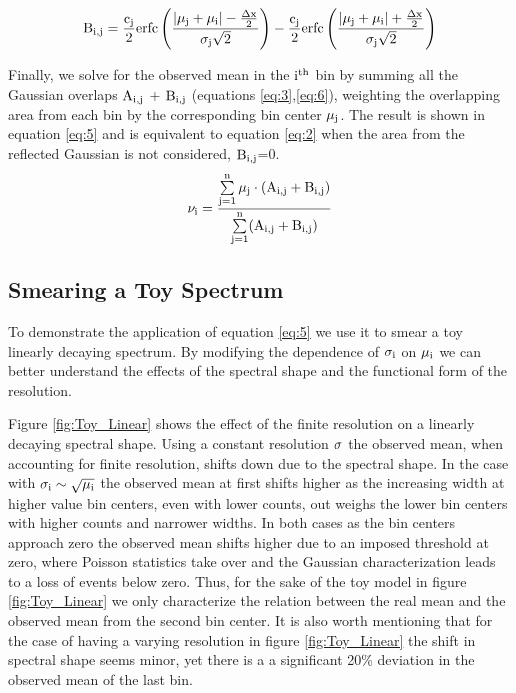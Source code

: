 \begin{equation}
\rm B_{i,j}=
\rm \frac{c_j}{2} erfc\left(\frac{|\mu_j+\mu_i| - \frac{\Delta x}{2}}{\sigma _j\sqrt{2}} \right) - 
\rm \frac{c_j}{2} erfc\left(\frac{|\mu_j+\mu_i| + \frac{\Delta x}{2}}{\sigma _j\sqrt{2}} \right)
\label{eq:6}
\end{equation}


Finally, we solve for the observed mean in the $\rm i^{th}$ bin by summing all the Gaussian overlaps $\rm A_{i,j}$ + $\rm B_{i,j}$ (equations \ref{eq:3},\ref{eq:6}), weighting the overlapping area from each bin by the corresponding bin center $\rm \mu_j$. The result is shown in equation \ref{eq:5} and is equivalent to equation \ref{eq:2} when the area from the reflected Gaussian is not considered, $\rm B_{i,j}$=0.
\begin{equation}
\rm \nu_i =  \frac{\sum\limits_{j=1}^{n}\mu_j\cdot (A_{i,j}+B_{i,j})}{\sum\limits_{j=1}^{n} (A_{i,j}+B_{i,j})}
\label{eq:5}
\end{equation}

\subsection{Smearing a Toy Spectrum}

To demonstrate the application of equation \ref{eq:5} we use it to smear a toy linearly decaying spectrum. By modifying the dependence of $\rm \sigma_i$ on $\rm \mu_i$ we can better understand the effects of the spectral shape and the functional form of the resolution.

Figure \ref{fig:Toy_Linear} shows the effect of the finite resolution on a linearly decaying spectral shape. Using a constant resolution $\rm \sigma$ the observed mean, when accounting for finite resolution, shifts down due to the spectral shape. In the case with $\rm \sigma_i \sim \sqrt{\mu_i} $ the observed mean at first shifts higher as the increasing width at higher value bin centers, even with lower counts, out weighs the lower bin centers with higher counts and narrower widths. In both cases as the bin centers approach zero the observed mean shifts higher due to an imposed threshold at zero, where Poisson statistics take over and the Gaussian characterization leads to a loss of events below zero. Thus, for the sake of the toy model in figure \ref{fig:Toy_Linear} we only characterize the relation between the real mean and the observed mean from the second bin center. It is also worth mentioning that for the case of having a varying resolution in figure \ref{fig:Toy_Linear} the shift in spectral shape seems minor, yet there is a a significant 20\% deviation in the observed mean of the last bin.


